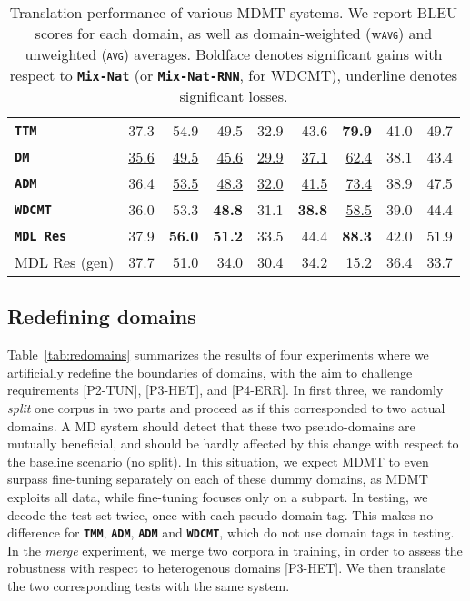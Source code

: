 \documentclass[11pt,a4paper]{article}
\newcommand{\fyTodo}[1]{\Todo[FY:]{\textcolor{orange}{#1}}}
\newcommand{\fyDone}[1]{\done[FY]\Todo[FY:]{\textcolor{orange}{#1}}}
\newcommand{\domain}[1]{\texttt{\textsc{#1}}}
\newcommand{\system}[1]{\texttt{\textbf{#1}}}
\newcommand{\SB}[1]{\textbf{#1}}
\newcommand{\SW}[1]{\underline{#1}}
\begin{document}
\begin{table*}
\begin{tabular}{|p{3cm}|*{8}{r|}}
    \system{TTM}            & 37.3 & 54.9 & 49.5 & 32.9 & 43.6 & \SB{79.9} &41.0 & 49.7     \\%
    \system{DM}             & \SW{35.6} & \SW{49.5}  & \SW{45.6}& \SW{29.9} & \SW{37.1} & \SW{62.4} & 38.1 & 43.4 \\ %
    \system{ADM}           & 36.4 & \SW{53.5}  & \SW{48.3} & \SW{32.0} & \SW{41.5} & \SW{73.4} & 38.9 & 47.5 \\%
    \system{WDCMT}       & 36.0 & 53.3 & \SB{48.8} & 31.1 & \SB{38.8} & \SW{58.5} & 39.0 & 44.4 \\ %
    \system{MDL Res}     & 37.9 & \SB{56.0}  & \SB{51.2}   & 33.5   &  44.4  & \SB{88.3} & 42.0 & 51.9 \\%
    \hfill MDL Res (gen)    & 37.7 & 51.0 & 34.0 & 30.4 & 34.2 & 15.2 & 36.4 & 33.7\\
     \hline
  \end{tabular}
  \caption{Translation performance of various MDMT systems. We report BLEU scores for each domain, as well as domain-weighted (w\domain{avg}) and unweighted (\domain{avg}) averages. Boldface denotes significant gains with respect to \system{Mix-Nat} (or \system{Mix-Nat-RNN}, for WDCMT), underline denotes significant losses.}
  \label{tab:performance}
  \fyTodo{Do we have significancy tests for averages?} %
\end{table*}

\subsection{Redefining domains \label{ssec:redomains}}

Table~\ref{tab:redomains} summarizes the results of four experiments where we artificially redefine the boundaries of domains, with the aim to challenge requirements [P2-TUN], [P3-HET], and [P4-ERR]. In first three, we randomly \emph{split} one corpus in two parts and proceed as if this corresponded to two actual domains. A MD system should detect that these two pseudo-domains are mutually beneficial, and should be hardly affected by this change with respect to the baseline scenario (no split). In this situation, we expect MDMT to even surpass fine-tuning separately on each of these dummy domains, as MDMT exploits all data, while fine-tuning focuses only on a subpart. In testing, we decode the test set twice, once with each pseudo-domain tag. This makes no difference for \system{TMM}, \system{ADM}, \system{ADM} and \system{WDCMT}, which do not use domain tags in testing.
In the \textsl{merge} experiment, we merge two corpora in training, in order to assess the robustness with respect to heterogenous domains [P3-HET]. We then translate the two corresponding tests with the same system.
\end{document}
